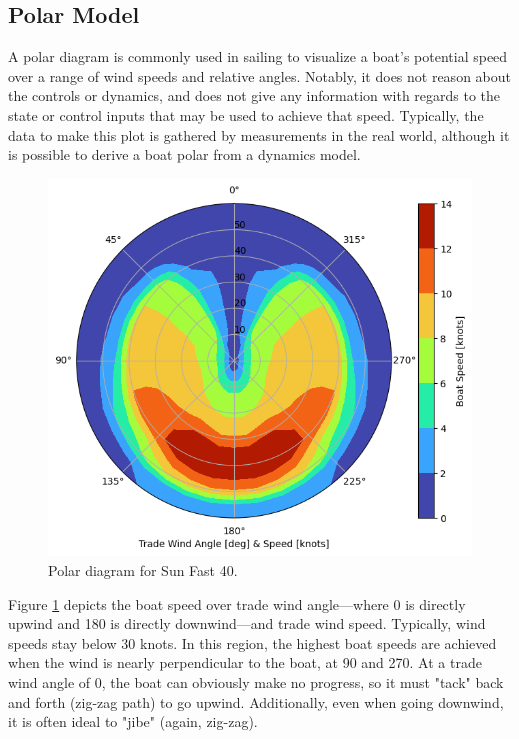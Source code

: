 \documentclass[conference]{IEEEtran}
\begin{document}
\subsection{Polar Model}
\label{section:polar_model}
A polar diagram is commonly used in sailing to visualize a boat's potential speed over a range of wind speeds and relative angles. Notably, it does not reason about the controls or dynamics, and does not give any information with regards to the state or control inputs that may be used to achieve that speed. Typically, the data to make this plot is gathered by measurements in the real world, although it is possible to derive a boat polar from a dynamics model.

\begin{figure}[ht]
    \centering
    \includegraphics[width=.9\columnwidth]{fig/polar.png}
    \caption{Polar diagram for Sun Fast 40.}
    \label{fig:polar}
\end{figure}

Figure \ref{fig:polar} depicts the boat speed over trade wind angle---where 0\degree{} is directly upwind and 180\degree{} is directly downwind---and trade wind speed. Typically, wind speeds stay below 30 knots. In this region, the highest boat speeds are achieved when the wind is nearly perpendicular to the boat, at 90\degree{} and 270\degree{}. At a trade wind angle of 0\degree{}, the boat can obviously make no progress, so it must "tack" back and forth (zig-zag path) to go upwind. Additionally, even when going downwind, it is often ideal to "jibe" (again, zig-zag).
\end{document}

